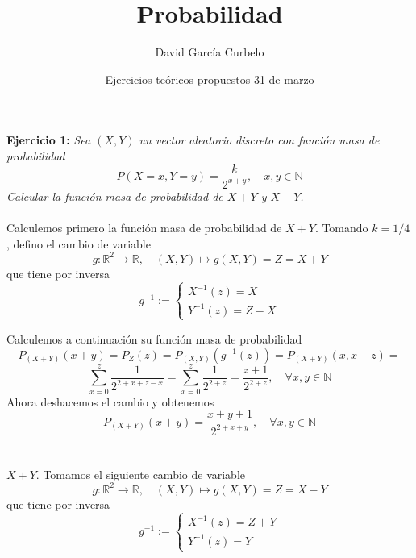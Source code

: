\documentclass[fleqn]{article}
\author{David García Curbelo}
\title{Probabilidad}
\date{Ejercicios teóricos propuestos 31 de marzo}
\def\R{\mathds{R}}
\def\N{\mathds{N}}
\begin{document}
    \setcounter{page}{1}
    \pagestyle{plain}
    \maketitle
    

    \textbf{Ejercicio 1: } \textit{Sea $(X,Y)$ un vector aleatorio discreto con
    función masa de probabilidad
    $$P(X=x,Y=y)=\frac{k}{2^{x+y}}, \quad x,y \in \N$$
    Calcular la función masa de probabilidad de $X+Y$ y $X-Y$.}\\ \\

    Calculemos primero la función masa de probabilidad de $X+Y$. Tomando $k=1/4$, defino el cambio de variable
    \begin{equation*}
            g:\R^2 \longrightarrow \R, \quad
            (X,Y) \longmapsto g(X,Y) = Z = X+Y
    \end{equation*}
    que tiene por inversa
    \begin{equation*}
        g^{-1}:= \left\{
        \begin{aligned}
            X^{-1}(z) = X \\
            Y^{-1}(z) = Z - X           
        \end{aligned}
        \right.
    \end{equation*}

    Calculemos a continuación su función masa de probabilidad 
    $$P_{(X+Y)}(x+y) = P_Z(z) = P_{(X,Y)}(g^{-1}(z)) = P_{(X+Y)}(x,x-z) = $$
    $$\sum _{x=0}^z \frac{1}{2^{2+x+z-x}} = \sum _{x=0}^z \frac{1}{2^{2+z}} = 
    \frac{z+1}{2^{2+z}}, \quad \forall x,y \in \N$$
    Ahora deshacemos el cambio y obtenemos
    $$P_{(X+Y)}(x+y) = \frac{x+y+1}{2^{2+x+y}}, \quad \forall x,y \in \N$$\\ \\

    $X+Y$. Tomamos el siguiente cambio de variable
    \begin{equation*}
        g:\R^2 \longrightarrow \R, \quad
        (X,Y) \longmapsto g(X,Y) = Z = X-Y
    \end{equation*}
    que tiene por inversa
    \begin{equation*}
        g^{-1}:= \left\{
        \begin{aligned}
            X^{-1}(z) = Z +Y \\
            Y^{-1}(z) = Y           
        \end{aligned}
        \right.
    \end{equation*}
\end{document}
